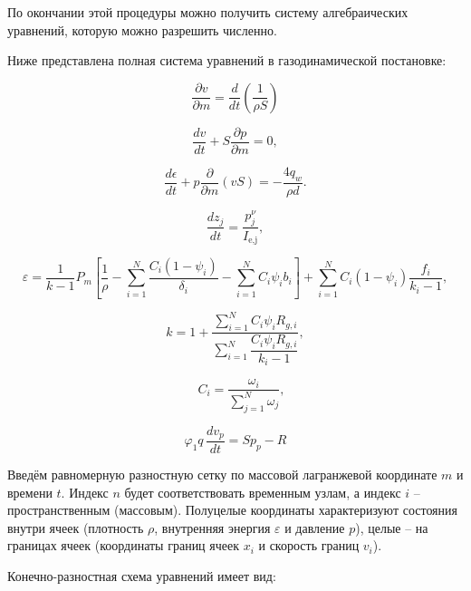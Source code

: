\documentclass[14pt, a4paper]{extreport} %
\begin{document}
По окончании этой процедуры можно получить систему алгебраических уравнений, которую можно разрешить численно.

Ниже представлена полная система уравнений в газодинамической постановке: 

\begin{equation}
\frac{\partial v}{\partial m} = \frac{d}{dt}\left(\frac{1}{\rho S}\right)
\end{equation}

\begin{equation}
\frac{dv}{dt} + S\frac{\partial p}{\partial m} = 0,
\end{equation}

\begin{equation}
\frac{d\epsilon}{dt} + p\frac{\partial}{\partial m}(vS) = -\frac{4q_w}{\rho d}.
\end{equation}

\begin{equation}
\frac{dz_j}{dt} = \frac{p^\nu_j}{I_{\text{e,j}}}, 
\end{equation}

\begin{equation}
\varepsilon = \frac{1}{k-1} P_m \left[ \frac{1}{\rho} - \sum_{i=1}^N \frac{C_i (1 - \psi_i)}{\delta_i} - \sum_{i=1}^N C_i \psi_i b_i \right] + \sum_{i=1}^N C_i (1 - \psi_i) \frac{f_i}{k_i - 1}, 
\end{equation}

\begin{equation}
k = 1 + \frac{\sum_{i=1}^N C_i \psi_i R_{g,i}}{\sum_{i=1}^N \dfrac{C_i \psi_i R_{g,i}}{k_i - 1}},
\end{equation}

\begin{equation}
\quad C_i = \frac{\omega_i}{\sum_{j=1}^N \omega_j},
\end{equation}

\begin{equation}
\varphi_1 q \, \dfrac{d v_{p}}{d t} = S p_{p} - R
\end{equation}


Введём равномерную разностную сетку по массовой лагранжевой координате $m$ и времени $t$. Индекс $n$ будет соответствовать временным узлам, а индекс $i$ -- пространственным (массовым). Полуцелые координаты характеризуют состояния внутри ячеек (плотность $\rho$, внутренняя энергия $\varepsilon$ и давление $p$), целые -- на границах ячеек (координаты границ ячеек $x_i$ и скорость границ $v_i$).

Конечно-разностная схема уравнений имеет вид: 
\end{document}
